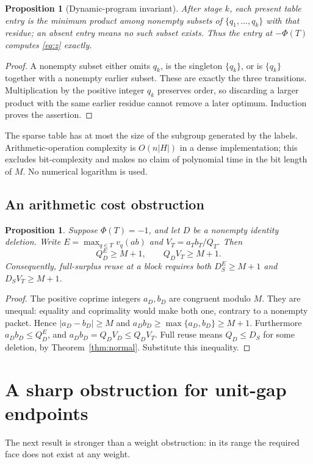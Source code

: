 \documentclass[11pt]{article}
\newtheorem{proposition}[theorem]{Proposition}
\theoremstyle{definition}\newtheorem{definition}[theorem]{Definition}
\theoremstyle{remark}\newtheorem{remark}[theorem]{Remark}
\begin{document}
\begin{proposition}[Dynamic-program invariant]
After stage \(k\), each present table entry is the minimum product among
nonempty subsets of \(\{q_1,\ldots,q_k\}\) with that residue; an absent
entry means no such subset exists. Thus the entry at \(-\Phi(T)\) computes
\eqref{eq:z} exactly.
\end{proposition}
\begin{proof}
A nonempty subset either omits \(q_k\), is the singleton \(\{q_k\}\), or
is \(\{q_k\}\) together with a nonempty earlier subset. These are exactly
the three transitions. Multiplication by the positive integer \(q_k\)
preserves order, so discarding a larger product with the same earlier residue
cannot remove a later optimum. Induction proves the assertion.
\end{proof}
The sparse table has at most the size of the subgroup generated by the
labels. Arithmetic-operation complexity is \(O(n|H|)\) in a dense
implementation; this excludes bit-complexity and makes no claim of polynomial
time in the bit length of \(M\). No numerical logarithm is used.

\subsection{An arithmetic cost obstruction}
\begin{proposition}\label{prop:cost}
Suppose \(\Phi(T)=-1\), and let \(D\) be a nonempty identity deletion.
Write \(E=\max_{q\in T}v_q(ab)\) and
\(V_T=a_Tb_T/Q_T\). Then
\[
 Q_D^E\ge M+1,\qquad Q_DV_T\ge M+1.
\]
Consequently, full-surplus reuse at a block requires both
\(D_S^E\ge M+1\) and \(D_SV_T\ge M+1\).
\end{proposition}
\begin{proof}
The positive coprime integers \(a_D,b_D\) are congruent modulo \(M\).
They are unequal: equality and coprimality would make both one, contrary to
a nonempty packet. Hence \(|a_D-b_D|\ge M\) and
\(a_Db_D\ge\max\{a_D,b_D\}\ge M+1\).
Furthermore \(a_Db_D\le Q_D^E\), and
\(a_Db_D=Q_DV_D\le Q_DV_T\).
Full reuse means \(Q_D\le D_S\) for some deletion, by
Theorem~\ref{thm:normal}. Substitute this inequality.
\end{proof}

\section{A sharp obstruction for unit-gap endpoints}
The next result is stronger than a weight obstruction: in its range the
required face does not exist at any weight.
\end{document}
